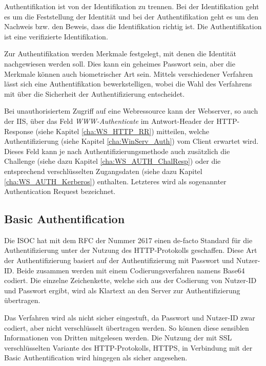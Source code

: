 Authentifikation ist von der Identifikation zu trennen. Bei der Identifikation geht es um die Feststellung der Identität und bei der Authentifikation geht es um den Nachweis bzw. den Beweis, dass die Identifikation richtig ist. Die Authentifikation ist eine verifizierte Identifikation. \cite[S. 198]{Eckert.2009}

Zur Authentifikation werden Merkmale festgelegt, mit denen die Identität nachgewiesen werden soll. Dies kann ein geheimes Passwort sein, aber die Merkmale können auch biometrischer Art sein. \cite[S. 198]{Eckert.2009}
Mittels verschiedener Verfahren lässt sich eine Authentifikation bewerkstelligen, wobei die Wahl des Verfahrens mit über die Sicherheit der Authentifizierung entscheidet.

Bei unauthorisiertem Zugriff auf eine Webressource kann der Webserver, so auch der \ac{IIS}, über das Feld \emph{WWW-Authenticate} im Antwort-Header der HTTP-Response (siehe Kapitel \ref{cha:WS_HTTP_RR}) mitteilen, welche Authentifizierung (siehe Kapitel \ref{cha:WinServ_Auth}) vom Client erwartet wird. \cite{Franks.1999} Dieses Feld kann je nach Authentifizierungsmethode auch zusätzlich die Challenge (siehe dazu Kapitel \ref{cha:WS_AUTH_ChalResp}) oder die entsprechend verschlüsselten Zugangsdaten (siehe dazu Kapitel \ref{cha:WS_AUTH_Kerberos}) enthalten. Letzteres wird als sogenannter Authentication Request bezeichnet. \cite{Jaganathan.2006}


\subsection{Basic Authentification}
\label{cha:WinServ_Auth_Basic}
Die \ac{ISOC} hat mit dem \ac{RFC} der Nummer 2617 einen de-facto Standard für die Authentifizierung unter der Nutzung des HTTP-Protokolls geschaffen. Diese Art der Authentifizierung basiert auf der Authentifizierung mit Passwort und Nutzer-ID.  Beide zusammen werden mit einem Codierungsverfahren namens Base64 codiert. Die einzelne Zeichenkette, welche sich aus der Codierung von Nutzer-ID und Passwort ergibt, wird als Klartext an den Server zur Authentifizierung übertragen. \cite{Franks.1999}

Das Verfahren wird als nicht sicher eingestuft, da Passwort und Nutzer-ID zwar codiert, aber nicht verschlüsselt übertragen werden. So können diese sensiblen Informationen von Dritten mitgelesen werden. Die Nutzung der mit \ac{SSL} verschlüsselten Variante des \ac{HTTP}-Protokolls, \ac{HTTPS}, in Verbindung mit der Basic Authentification wird hingegen als sicher angesehen. \cite{Franks.1999}

